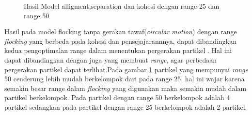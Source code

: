 \begin{figure}
\hfill
{}

\caption{Hasil Model alligment,separation dan kohesi dengan range 25 dan range 50}
\label{fig:2grafikmodel3gaya}
\end{figure}

Hasil pada model flocking tanpa gerakan tawaf(\textit{circular motion}) dengan range \textit{flocking} yang berbeda pada kohesi dan pensejajarannnya, dapat dibandingkan kedua pengoptimalan range dalam menentukan pergerakan partikel . Hal ini dapat dibandingkan dengan \citep{HUTH1992} juga yang membuat \textit{range}, agar perbedaan pergerakan partikel dapat terlihat.Pada gambar \ref{fig:2grafikmodel3gaya} partikel yang mempunyai \textit{range} 50 cenderung lebih mudah berkelompok  dari pada range 25. hal ini wajar karena semakin besar range dalam \textit{flocking} yang digunakan maka semakin mudah dalam partikel berkelompok. Pada partikel dengan range 50 berkelompok adalah 4 partikel sedangkan pada partikel dengan range 25 berkelompok adalah 2 partikel. 

